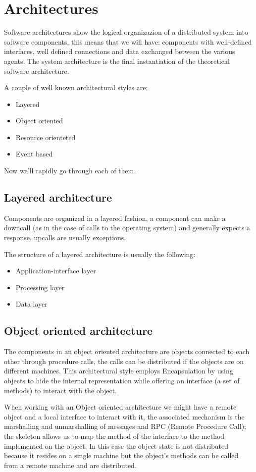 \chapter{Architectures}
Software architectures show the logical organizazion of a distributed system into software components, this means that we will have: components with well-defined interfaces, well defined connections and data exchanged between the various agents. The system architecture is the final instantiation of the theoretical software architecture.

A couple of well known architectural styles are:
\begin{itemize}
    \item Layered
    \item Object oriented
    \item Resource orienteted
    \item Event based
\end{itemize}
Now we'll rapidly go through each of them.

\section{Layered architecture}
Components are organized in a layered fashion, a component can make a downcall (as in the case of calls to the operating system) and generally expects a response, upcalls are usually exceptions.

The structure of a layered architecture is usually the following:
\begin{itemize}
    \item Application-interface layer
    \item Processing layer
    \item Data layer
\end{itemize}

\section{Object oriented architecture}
The components in an object oriented architecture are objects connected to each other through procedure calls, the calls can be distributed if the objects are on different machines. This architectural style employs Encapsulation by using objects to hide the internal representation while offering an interface (a set of methods) to interact with the object.

When working with an Object oriented architecture we might have a remote object and a local interface to interact with it, the associated mechanism is the marshalling and unmarshalling of messages and RPC (Remote Procedure Call); the skeleton allows us to map the method of the interface to the method implemented on the object. In this case the object state is not distributed because it resides on a single machine but the object's methods can be called from a remote machine and are distributed.

